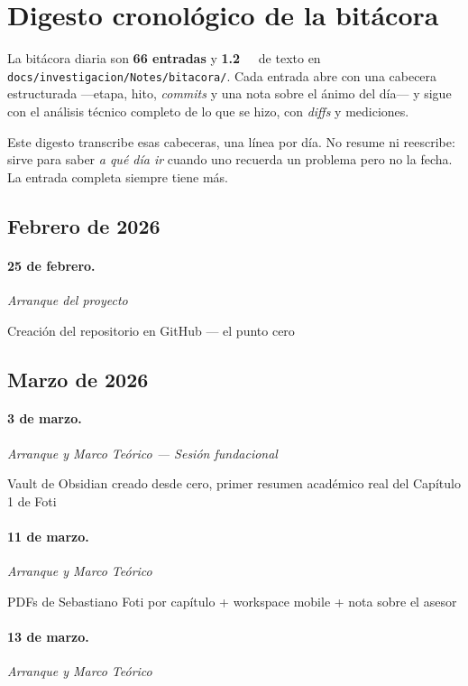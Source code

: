 \section{Digesto cronol\'ogico de la bit\'acora}
\label{sec:digesto}

La bit\'acora diaria son \textbf{66 entradas} y
\textbf{\SI{1.2}{\mebi\byte}} de texto en
\texttt{docs/investigacion/Notes/bitacora/}. Cada entrada abre con una cabecera
estructurada ---etapa, hito, \emph{commits} y una nota sobre el \'animo del
d\'ia--- y sigue con el an\'alisis t\'ecnico completo de lo que se hizo, con
\emph{diffs} y mediciones.

Este digesto transcribe esas cabeceras, una l\'inea por d\'ia. No resume ni
reescribe: sirve para saber \emph{a qu\'e d\'ia ir} cuando uno recuerda un
problema pero no la fecha. La entrada completa siempre tiene m\'as.

\subsection{Febrero de 2026}
\paragraph{25 de febrero.}
\emph{Arranque del proyecto}

Creación del repositorio en GitHub --- el punto cero

\subsection{Marzo de 2026}
\paragraph{3 de marzo.}
\emph{Arranque y Marco Teórico --- Sesión fundacional}

Vault de Obsidian creado desde cero, primer resumen académico real del Capítulo 1 de Foti

\paragraph{11 de marzo.}
\emph{Arranque y Marco Teórico}

PDFs de Sebastiano Foti por capítulo + workspace mobile + nota sobre el asesor

\paragraph{13 de marzo.}
\emph{Arranque y Marco Teórico}

